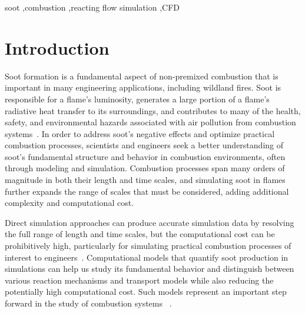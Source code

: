 \documentclass[preprint,letterpaper]{elsarticle}
\begin{document}
\begin{frontmatter}
\begin{keyword}
soot \sep combustion \sep reacting flow simulation \sep CFD
\end{keyword}

\end{frontmatter}




\section{Introduction}
\label{s:intro}

Soot formation is a fundamental aspect of non-premixed combustion that is important in many engineering applications, including wildland fires. Soot is responsible for a flame's luminosity, generates a large portion of a flame's radiative heat transfer to its surroundings, and contributes to many of the health, safety, and environmental hazards associated with air pollution from combustion systems~\cite{EPA_2009,EPA_2004}. In order to address soot's negative effects and optimize practical combustion processes, scientists and engineers seek a better understanding of soot's fundamental structure and behavior in combustion environments, often through modeling and simulation.
Combustion processes span many orders of magnitude in both their length and time scales, and simulating soot in flames further expands the range of scales that must be considered, adding additional complexity and computational cost.

Direct simulation approaches can produce accurate simulation data by resolving the full range of length and time scales, but the computational cost can be prohibitively high, particularly for simulating practical combustion processes of interest to engineers~\cite{Pope_2000}.
Computational models that quantify soot production in simulations can help us study its fundamental behavior and distinguish between various reaction mechanisms and transport models while also reducing the potentially high computational cost. Such models represent an important step forward in the study of combustion systems ~\cite{Frenklach_2002b}.
\end{document}
